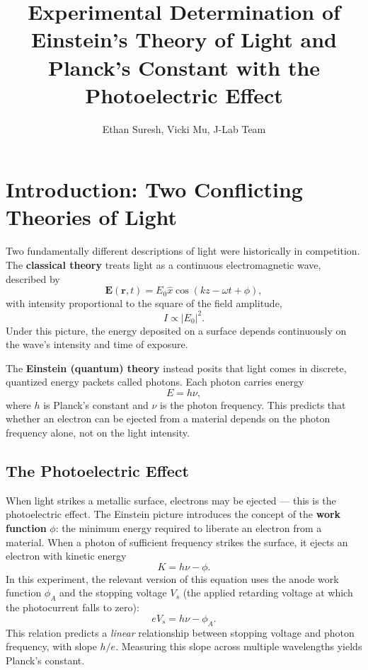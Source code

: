 \documentclass[12pt]{article}
\title{Experimental Determination of Einstein's Theory of Light and Planck's Constant with the Photoelectric Effect}
\author{Ethan Suresh, Vicki Mu, J-Lab Team}
\date{}
\begin{document}
\maketitle

\section{Introduction: Two Conflicting Theories of Light}

Two fundamentally different descriptions of light were historically in competition. The \textbf{classical theory} treats light as a continuous electromagnetic wave, described by
\begin{equation}
    \mathbf{E}(\mathbf{r}, t) = E_0 \hat{x} \cos(kz - \omega t + \phi),
\end{equation}
with intensity proportional to the square of the field amplitude,
\begin{equation}
    I \propto |E_0|^2.
\end{equation}
Under this picture, the energy deposited on a surface depends continuously on the wave's intensity and time of exposure.

The \textbf{Einstein (quantum) theory} instead posits that light comes in discrete, quantized energy packets called photons. Each photon carries energy
\begin{equation}
    E = h\nu,
\end{equation}
where $h$ is Planck's constant and $\nu$ is the photon frequency. This predicts that whether an electron can be ejected from a material depends on the photon frequency alone, not on the light intensity.

\subsection{The Photoelectric Effect}

When light strikes a metallic surface, electrons may be ejected — this is the photoelectric effect. The Einstein picture introduces the concept of the \textbf{work function} $\phi$: the minimum energy required to liberate an electron from a material. When a photon of sufficient frequency strikes the surface, it ejects an electron with kinetic energy
\begin{equation}
    K = h\nu - \phi.
\end{equation}
In this experiment, the relevant version of this equation uses the anode work function $\phi_A$ and the stopping voltage $V_s$ (the applied retarding voltage at which the photocurrent falls to zero):
\begin{equation}
    eV_s = h\nu - \phi_A.
\end{equation}
This relation predicts a \emph{linear} relationship between stopping voltage and photon frequency, with slope $h/e$. Measuring this slope across multiple wavelengths yields Planck's constant.
\end{document}
